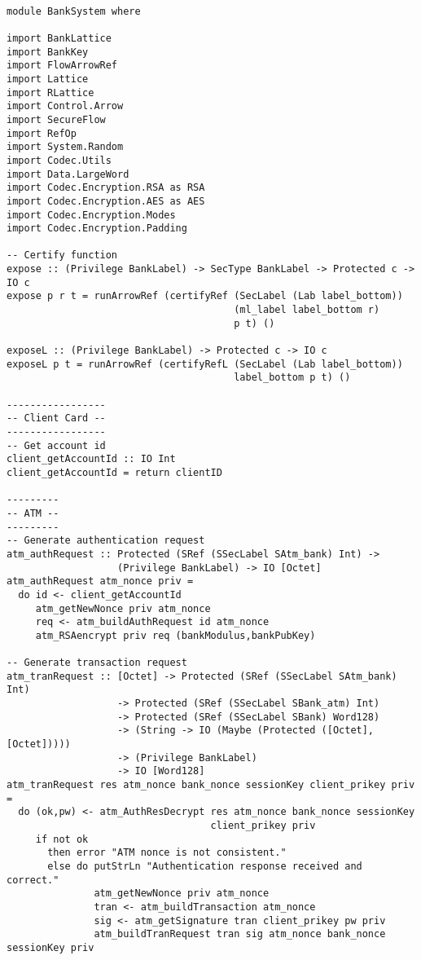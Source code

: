 \begin{Verbatim}[fontsize=\footnotesize,frame=lines,
                 framesep=5mm, label={[BankSystem.hs]BankSystem.hs}]

module BankSystem where

import BankLattice
import BankKey
import FlowArrowRef
import Lattice
import RLattice
import Control.Arrow
import SecureFlow
import RefOp
import System.Random
import Codec.Utils
import Data.LargeWord
import Codec.Encryption.RSA as RSA
import Codec.Encryption.AES as AES
import Codec.Encryption.Modes
import Codec.Encryption.Padding

-- Certify function
expose :: (Privilege BankLabel) -> SecType BankLabel -> Protected c -> IO c
expose p r t = runArrowRef (certifyRef (SecLabel (Lab label_bottom)) 
                                       (ml_label label_bottom r) 
                                       p t) ()

exposeL :: (Privilege BankLabel) -> Protected c -> IO c
exposeL p t = runArrowRef (certifyRefL (SecLabel (Lab label_bottom)) 
                                       label_bottom p t) ()

-----------------
-- Client Card --
-----------------
-- Get account id
client_getAccountId :: IO Int
client_getAccountId = return clientID

---------
-- ATM --
---------
-- Generate authentication request
atm_authRequest :: Protected (SRef (SSecLabel SAtm_bank) Int) -> 
                   (Privilege BankLabel) -> IO [Octet]
atm_authRequest atm_nonce priv = 
  do id <- client_getAccountId
     atm_getNewNonce priv atm_nonce
     req <- atm_buildAuthRequest id atm_nonce
     atm_RSAencrypt priv req (bankModulus,bankPubKey) 

-- Generate transaction request
atm_tranRequest :: [Octet] -> Protected (SRef (SSecLabel SAtm_bank) Int) 
                   -> Protected (SRef (SSecLabel SBank_atm) Int) 
                   -> Protected (SRef (SSecLabel SBank) Word128) 
                   -> (String -> IO (Maybe (Protected ([Octet],[Octet]))))
                   -> (Privilege BankLabel)
                   -> IO [Word128]
atm_tranRequest res atm_nonce bank_nonce sessionKey client_prikey priv = 
  do (ok,pw) <- atm_AuthResDecrypt res atm_nonce bank_nonce sessionKey 
                                   client_prikey priv   
     if not ok
       then error "ATM nonce is not consistent."
       else do putStrLn "Authentication response received and correct."
               atm_getNewNonce priv atm_nonce
               tran <- atm_buildTransaction atm_nonce
               sig <- atm_getSignature tran client_prikey pw priv
               atm_buildTranRequest tran sig atm_nonce bank_nonce sessionKey priv


\end{Verbatim}
